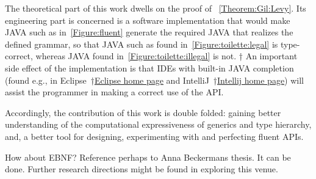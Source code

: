 The theoretical part of this work dwells on the proof of
~\cref{Theorem:Gil:Levy}.
Its engineering part is concerned is
  a software implementation that would make JAVA
  such as in~\cref{Figure:fluent} generate
  the required \Java JAVA that realizes the
  defined grammar, so that JAVA such as
  found in~\cref{Figure:toilette:legal} is type-correct,
  whereas JAVA found in~\cref{Figure:toilette:illegal} is not.	
†{%
An important side effect of the implementation is that IDEs with built-in JAVA
completion
 (found e.g., in Eclipse~†{\href{http://www.eclipse.org/}{Eclipse home page}} and IntelliJ~†{\href{https://www.jetbrains.com/idea/}{Intellij home page}})
 will assist the programmer in making a correct use of the API.
 }

Accordingly, the contribution of this work is double folded:
  gaining better understanding of the computational expressiveness of
  \Java generics and type hierarchy, and, a better tool
  for designing, experimenting with and perfecting fluent APIs.

How about EBNF? Reference perhaps to Anna Beckermans thesis.%
It can be done. Further research directions might be found in exploring this venue. 
